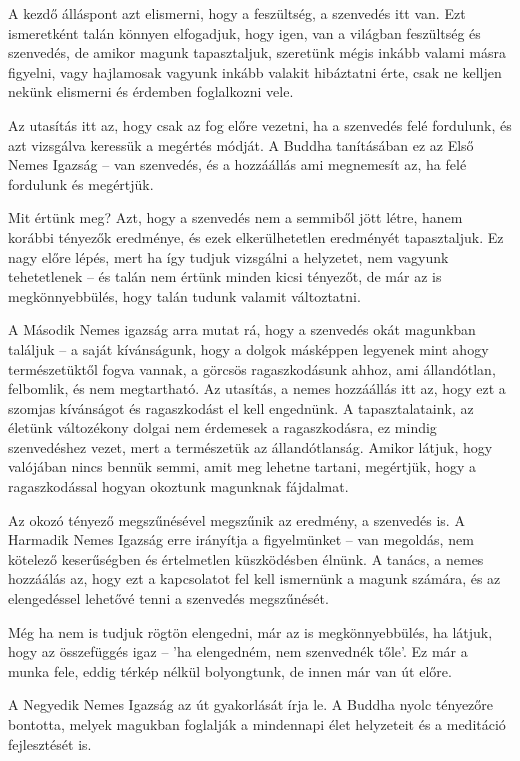 A kezdő álláspont azt elismerni, hogy a feszültség, a szenvedés itt van.
Ezt ismeretként talán könnyen elfogadjuk, hogy igen, van a világban
feszültség és szenvedés, de amikor magunk tapasztaljuk, szeretünk mégis
inkább valami másra figyelni, vagy hajlamosak vagyunk inkább valakit
hibáztatni érte, csak ne kelljen nekünk elismerni és érdemben
foglalkozni vele.

Az utasítás itt az, hogy csak az fog előre vezetni, ha a szenvedés felé
fordulunk, és azt vizsgálva keressük a megértés módját. A Buddha
tanításában ez az Első Nemes Igazság -- van szenvedés, és a hozzáállás
ami megnemesít az, ha felé fordulunk és megértjük.

Mit értünk meg? Azt, hogy a szenvedés nem a semmiből jött létre, hanem
korábbi tényezők eredménye, és ezek elkerülhetetlen eredményét
tapasztaljuk. Ez nagy előre lépés, mert ha így tudjuk vizsgálni a
helyzetet, nem vagyunk tehetetlenek -- és talán nem értünk minden kicsi
tényezőt, de már az is megkönnyebbülés, hogy talán tudunk valamit
változtatni.

A Második Nemes igazság arra mutat rá, hogy a szenvedés okát magunkban
találjuk -- a saját kívánságunk, hogy a dolgok másképpen legyenek mint
ahogy természetüktől fogva vannak, a görcsös ragaszkodásunk ahhoz, ami
állandótlan, felbomlik, és nem megtartható. Az utasítás, a nemes
hozzáállás itt az, hogy ezt a szomjas kívánságot és ragaszkodást el kell
engednünk. A tapasztalataink, az életünk változékony dolgai nem
érdemesek a ragaszkodásra, ez mindig szenvedéshez vezet, mert a
természetük az állandótlanság. Amikor látjuk, hogy valójában nincs
bennük semmi, amit meg lehetne tartani, megértjük, hogy a ragaszkodással
hogyan okoztunk magunknak fájdalmat.

Az okozó tényező megszűnésével megszűnik az eredmény, a szenvedés is. A
Harmadik Nemes Igazság erre irányítja a figyelmünket -- van megoldás,
nem kötelező keserűségben és értelmetlen küszködésben élnünk. A tanács,
a nemes hozzáálás az, hogy ezt a kapcsolatot fel kell ismernünk a magunk
számára, és az elengedéssel lehetővé tenni a szenvedés megszűnését.

Még ha nem is tudjuk rögtön elengedni, már az is megkönnyebbülés, ha
látjuk, hogy az összefüggés igaz -- 'ha elengedném, nem szenvednék
tőle'. Ez már a munka fele, eddig térkép nélkül bolyongtunk, de innen
már van út előre.

A Negyedik Nemes Igazság az út gyakorlását írja le. A Buddha nyolc
tényezőre bontotta, melyek magukban foglalják a mindennapi élet
helyzeteit és a meditáció fejlesztését is.

